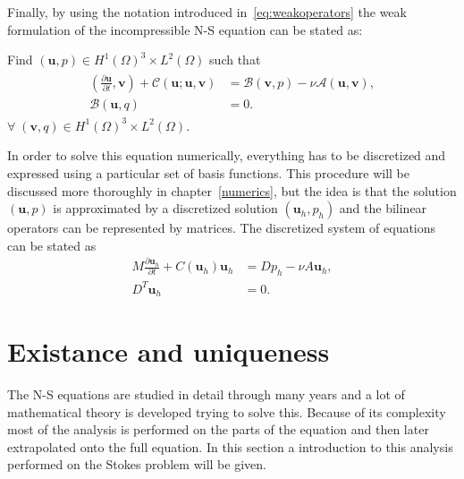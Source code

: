 Finally, by using the notation introduced in~\ref{eq:weakoperators} the weak formulation of the incompressible
N-S equation can be stated as: 

Find $(\mathbf{u}, p) \in H^1(\Omega)^3\times L^2(\Omega)$ such that 
\begin{align}
    \begin{split}
        (\frac{\partial \mathbf{u}}{\partial t},\mathbf{v})
        + \mathcal{C}(\mathbf{u};\mathbf{u},\mathbf{v})
        &= \mathcal{B}(\mathbf{v},p) 
        -\nu\mathcal{A}(\mathbf{u},\mathbf{v}), \\
        \mathcal{B}(\mathbf{u},q) &= 0.
    \end{split}
	\label{eq:NSweak}
\end{align}
$\forall\; (\mathbf{v}, q) \in H^1(\Omega)^3\times L^2(\Omega)$.
%

In order to solve this equation numerically, everything has to be discretized and expressed 
using a particular set of basis functions. This procedure will be discussed more thoroughly
in chapter~\ref{numerics}, but the idea is that the solution $(\mathbf{u},p)$ is approximated 
by a discretized solution $(\mathbf{u}_h,p_h)$ and the bilinear operators can be represented 
by matrices. The discretized system of equations can be stated as
%
\begin{align}
    M\frac{\partial \mathbf{u}_h}{\partial t} +C(\mathbf{u}_h)\mathbf{u}_h &= Dp_h-\nu A\mathbf{u}_h,\\
    D^T\mathbf{u}_h &= 0.
    \label{eq:NSMatrixform}
\end{align}
%
\section{Existance and uniqueness}
The N-S equations are studied in detail through many years and a lot of mathematical 
theory is developed trying to solve this. Because of its complexity most of the analysis 
is performed on the parts of the equation and then later extrapolated onto the full 
equation. In this section a introduction to this analysis performed on the Stokes 
problem will be given. 

